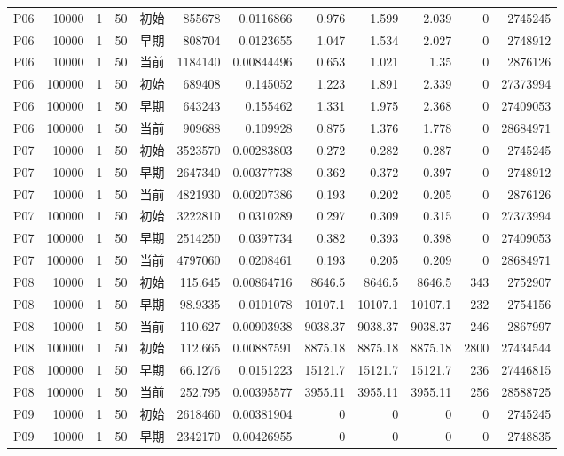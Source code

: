 \documentclass[UTF8,a4paper,10pt,twocolumn,fontset=fandol]{ctexart}
\begin{document}
\begin{longtable}{@{}lrrrlrrrrrrr@{}}
P06 & 10000 & 1 & 50 & 初始 & 855678 & 0.0116866 & 0.976 & 1.599 & 2.039 & 0 & 2745245 \\
P06 & 10000 & 1 & 50 & 早期 & 808704 & 0.0123655 & 1.047 & 1.534 & 2.027 & 0 & 2748912 \\
P06 & 10000 & 1 & 50 & 当前 & 1184140 & 0.00844496 & 0.653 & 1.021 & 1.35 & 0 & 2876126 \\
P06 & 100000 & 1 & 50 & 初始 & 689408 & 0.145052 & 1.223 & 1.891 & 2.339 & 0 & 27373994 \\
P06 & 100000 & 1 & 50 & 早期 & 643243 & 0.155462 & 1.331 & 1.975 & 2.368 & 0 & 27409053 \\
P06 & 100000 & 1 & 50 & 当前 & 909688 & 0.109928 & 0.875 & 1.376 & 1.778 & 0 & 28684971 \\
P07 & 10000 & 1 & 50 & 初始 & 3523570 & 0.00283803 & 0.272 & 0.282 & 0.287 & 0 & 2745245 \\
P07 & 10000 & 1 & 50 & 早期 & 2647340 & 0.00377738 & 0.362 & 0.372 & 0.397 & 0 & 2748912 \\
P07 & 10000 & 1 & 50 & 当前 & 4821930 & 0.00207386 & 0.193 & 0.202 & 0.205 & 0 & 2876126 \\
P07 & 100000 & 1 & 50 & 初始 & 3222810 & 0.0310289 & 0.297 & 0.309 & 0.315 & 0 & 27373994 \\
P07 & 100000 & 1 & 50 & 早期 & 2514250 & 0.0397734 & 0.382 & 0.393 & 0.398 & 0 & 27409053 \\
P07 & 100000 & 1 & 50 & 当前 & 4797060 & 0.0208461 & 0.193 & 0.205 & 0.209 & 0 & 28684971 \\
P08 & 10000 & 1 & 50 & 初始 & 115.645 & 0.00864716 & 8646.5 & 8646.5 & 8646.5 & 343 & 2752907 \\
P08 & 10000 & 1 & 50 & 早期 & 98.9335 & 0.0101078 & 10107.1 & 10107.1 & 10107.1 & 232 & 2754156 \\
P08 & 10000 & 1 & 50 & 当前 & 110.627 & 0.00903938 & 9038.37 & 9038.37 & 9038.37 & 246 & 2867997 \\
P08 & 100000 & 1 & 50 & 初始 & 112.665 & 0.00887591 & 8875.18 & 8875.18 & 8875.18 & 2800 & 27434544 \\
P08 & 100000 & 1 & 50 & 早期 & 66.1276 & 0.0151223 & 15121.7 & 15121.7 & 15121.7 & 236 & 27446815 \\
P08 & 100000 & 1 & 50 & 当前 & 252.795 & 0.00395577 & 3955.11 & 3955.11 & 3955.11 & 256 & 28588725 \\
P09 & 10000 & 1 & 50 & 初始 & 2618460 & 0.00381904 & 0 & 0 & 0 & 0 & 2745245 \\
P09 & 10000 & 1 & 50 & 早期 & 2342170 & 0.00426955 & 0 & 0 & 0 & 0 & 2748835 \\

\end{longtable}
\end{document}
